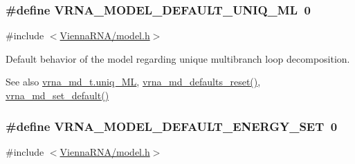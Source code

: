 \subsubsection[{\texorpdfstring{V\+R\+N\+A\+\_\+\+M\+O\+D\+E\+L\+\_\+\+D\+E\+F\+A\+U\+L\+T\+\_\+\+U\+N\+I\+Q\+\_\+\+ML}{VRNA_MODEL_DEFAULT_UNIQ_ML}}]{\setlength{\rightskip}{0pt plus 5cm}\#define V\+R\+N\+A\+\_\+\+M\+O\+D\+E\+L\+\_\+\+D\+E\+F\+A\+U\+L\+T\+\_\+\+U\+N\+I\+Q\+\_\+\+ML~0}\hypertarget{group__model__details_ga63f6006a02ba2d89148441f406c309e7}{}\label{group__model__details_ga63f6006a02ba2d89148441f406c309e7}


{\ttfamily \#include $<$\hyperlink{model_8h}{Vienna\+R\+N\+A/model.\+h}$>$}



Default behavior of the model regarding unique multibranch loop decomposition. 

\begin{DoxySeeAlso}{See also}
\hyperlink{group__model__details_ade065b814a4e2e72ead93ab502613ed2}{vrna\+\_\+md\+\_\+t.\+uniq\+\_\+\+ML}, \hyperlink{group__model__details_ga70834424cf804d149937de89f80ceb45}{vrna\+\_\+md\+\_\+defaults\+\_\+reset()}, \hyperlink{group__model__details_ga8ac6ff84936282436f822644bf841f66}{vrna\+\_\+md\+\_\+set\+\_\+default()} 
\end{DoxySeeAlso}
\subsubsection[{\texorpdfstring{V\+R\+N\+A\+\_\+\+M\+O\+D\+E\+L\+\_\+\+D\+E\+F\+A\+U\+L\+T\+\_\+\+E\+N\+E\+R\+G\+Y\+\_\+\+S\+ET}{VRNA_MODEL_DEFAULT_ENERGY_SET}}]{\setlength{\rightskip}{0pt plus 5cm}\#define V\+R\+N\+A\+\_\+\+M\+O\+D\+E\+L\+\_\+\+D\+E\+F\+A\+U\+L\+T\+\_\+\+E\+N\+E\+R\+G\+Y\+\_\+\+S\+ET~0}\hypertarget{group__model__details_ga6fcf6b2d0f89256cdbd166486c9b6e1e}{}\label{group__model__details_ga6fcf6b2d0f89256cdbd166486c9b6e1e}


{\ttfamily \#include $<$\hyperlink{model_8h}{Vienna\+R\+N\+A/model.\+h}$>$}




